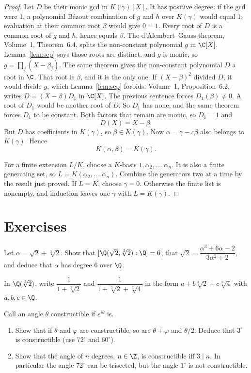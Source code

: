 \begin{proof}
Let $D$ be their monic gcd in
$K(\gamma)[X]$. It has positive degree: if the gcd were $1$, a polynomial
Bézout combination of $g$ and $h$ over $K(\gamma)$ would equal $1$;
evaluation at their common root $\beta$ would give $0=1$.
Every root of $D$ is a common root of $g$ and $h$, hence equals $\beta$.
The d'Alembert--Gauss theorem, Volume~1, Theorem~6.4, splits the non-constant polynomial $g$ in $\C[X]$.
Lemma~\ref{lem:sep} says those roots are distinct, and $g$ is monic, so
$g=\prod_j(X-\beta_j)$. The same theorem gives the non-constant polynomial $D$ a root in $\C$.
That root is $\beta$, and it is the only one. If $(X-\beta)^2$ divided $D$, it would divide $g$, which Lemma~\ref{lem:sep} forbids.
Volume~1, Proposition~6.2, writes $D=(X-\beta)D_1$ in $\C[X]$. The previous sentence forces $D_1(\beta)\ne0$.
A root of $D_1$ would be another root of $D$. So $D_1$ has none, and the same theorem forces $D_1$ to be constant.
Both factors that remain are monic, so $D_1=1$ and
\[
D(X)=X-\beta.
\]
But $D$ has coefficients in
$K(\gamma)$, so $\beta\in K(\gamma)$.
Now $\alpha=\gamma-c\beta$ also
belongs to $K(\gamma)$. Hence
\[
\boxed{K(\alpha,\beta)=K(\gamma)}.
\]

For a finite extension $L/K$,
choose a $K$-basis
$1,\alpha_2,\ldots,\alpha_n$.
It is also a finite generating set,
so $L=K(\alpha_2,\ldots,\alpha_n)$.
Combine the generators two at a
time by the result just proved.
If $L=K$, choose $\gamma=0$. Otherwise the finite list is nonempty,
and induction leaves one $\gamma$ with $L=K(\gamma)$.
\end{proof}

\section{Exercises}

\begin{exercise}[$\star$]\label{ex:sqrt23}
Let $\alpha=\sqrt2+\sqrt[3]2$. Show that $[\Q(\sqrt2,\sqrt[3]2):\Q]=6$, that $\sqrt2=\dfrac{\alpha^3+6\alpha-2}{3\alpha^2+2}$, and deduce that $\alpha$ has degree $6$ over $\Q$.
\end{exercise}

\begin{exercise}[$\star$]\label{ex:inverse}
In $\Q(\sqrt[3]2)$, write $\dfrac1{1+\sqrt[3]2}$ and $\dfrac1{1+\sqrt[3]2+\sqrt[3]4}$ in the form $a+b\sqrt[3]2+c\sqrt[3]4$ with $a,b,c\in\Q$.
\end{exercise}

\begin{exercise}[$\star\star$]\label{ex:classical}
Call an angle $\theta$ constructible if $e^{i\theta}$ is.
\begin{enumerate}[label=(\alph*)]
\item Show that if $\theta$ and $\varphi$ are constructible, so are $\theta\pm\varphi$ and $\theta/2$. Deduce that $3^\circ$ is constructible (use $72^\circ$ and $60^\circ$).
\item Show that the angle of $n$ degrees, $n\in\Z$, is constructible iff $3\mid n$. In particular the angle $72^\circ$ can be trisected, but the angle $1^\circ$ is not constructible.
\end{enumerate}
\end{exercise}


